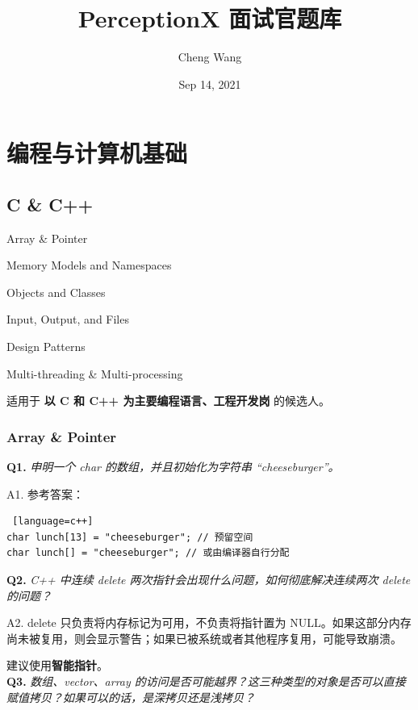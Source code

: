 \documentclass[cn,10pt,math=newtx,citestyle=gb7714-2015,bibstyle=gb7714-2015]{elegantbook}
\title{PerceptionX 面试官题库}
\author{Cheng Wang}
\date{Sep 14, 2021}
\begin{document}
\maketitle
\frontmatter

\tableofcontents

\mainmatter

\chapter{编程与计算机基础}

\section{C \& C++}

\begin{introduction}
\item Array \& Pointer
\item Memory Models and Namespaces
\item Objects and Classes
\item Input, Output, and Files
\item Design Patterns
\item Multi-threading \& Multi-processing
\end{introduction}

适用于 \textbf{以 C 和 C++ 为主要编程语言、工程开发岗}  的候选人。

\subsection{Array \& Pointer}
\textbf{Q1.} \textit{申明一个 char 的数组，并且初始化为字符串 ``cheeseburger''。}

A1. 参考答案：
\begin{lstlisting} [language=c++]
char lunch[13] = "cheeseburger"; // 预留空间
char lunch[] = "cheeseburger"; // 或由编译器自行分配
\end{lstlisting}


\textbf{Q2.} \textit{C++ 中连续 delete 两次指针会出现什么问题，如何彻底解决连续两次 delete 的问题？}

A2. delete 只负责将内存标记为可用，不负责将指针置为 NULL。如果这部分内存尚未被复用，则会显示警告；如果已被系统或者其他程序复用，可能导致崩溃。

建议使用\textbf{智能指针}。\\


\textbf{Q3.} \textit{数组、vector、array 的访问是否可能越界？这三种类型的对象是否可以直接赋值拷贝？如果可以的话，是深拷贝还是浅拷贝？}
\end{document}
